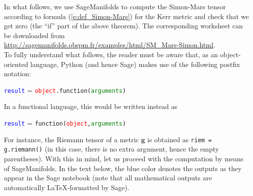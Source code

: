 \documentclass[a4paper]{jpconf}
\newcommand{\soft}[1]{\textsf{#1}}
\newcommand{\Sage}{\soft{Sage}}
\newcommand{\SM}{\soft{SageManifolds}}
\newcommand{\w}[1]{\bm{#1}}
\begin{document}
In what follows, we use \SM{} to compute the Simon-Mars tensor 
according to formula (\ref{e:def_Simon-Mars}) for the Kerr metric and check 
that we get zero (the ``if'' part of the above theorem). 
The corresponding worksheet can be downloaded from \\
\url{http://sagemanifolds.obspm.fr/examples/html/SM_Mars-Simon.html}.\\
To fully understand what follows, the reader must be aware that, 
as an object-oriented language, Python (and hence \Sage{}) makes use of 
the following postfix notation:
\begin{center}
\textcolor{blue}{\texttt{result}} = \textcolor{red}{\texttt{object}}\texttt{.}\texttt{function(}\textcolor{green}{\texttt{arguments}}\texttt{)}
\end{center}
In a functional language, this would be written instead as
 \begin{center}
\textcolor{blue}{\texttt{result}} = \texttt{function(}\textcolor{red}{\texttt{object}}\texttt{,}\textcolor{green}{\texttt{arguments}}\texttt{)}
\end{center}
For instance, the Riemann tensor of a metric $\w{g}$ is obtained as 
\verb+riem = g.riemann()+
(in this case, there is no extra argument, hence the empty parentheses). 
With this in mind, let us proceed with the computation by means of 
\SM{}. In the text below, the blue color denotes the outputs as they appear in
the \Sage{} notebook (note that all mathematical outputs are automatically
\LaTeX{}-formatted by \Sage).
\end{document}
